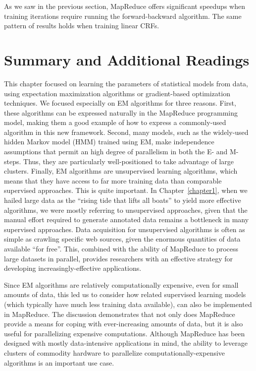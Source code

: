 As we saw in the previous section, MapReduce offers significant
speedups when training iterations require running the forward-backward
algorithm.  The same pattern of results holds when training linear
CRFs.

\section{Summary and Additional Readings}
\label{chapter6_conclusions}

This chapter focused on learning the parameters of statistical models
from data, using expectation maximization algorithms or gradient-based
optimization techniques.  We focused especially on EM algorithms for
three reasons.  First, these algorithms can be expressed naturally in
the MapReduce programming model, making them a good example of how to
express a commonly-used algorithm in this new framework.  Second, many
models, such as the widely-used hidden Markov model (HMM) trained
using EM, make independence assumptions that permit an high degree of
parallelism in both the E- and M-steps.  Thus, they are particularly
well-positioned to take advantage of large clusters.  Finally, EM
algorithms are unsupervised learning algorithms, which means that they
have access to far more training data than comparable supervised
approaches.  This is quite important.  In Chapter~\ref{chapter1}, when
we hailed large data as the ``rising tide that lifts all boats'' to
yield more effective algorithms, we were mostly referring to
unsupervised approaches, given that the manual effort required to
generate annotated data remains a bottleneck in many supervised
approaches.  Data acquisition for unsupervised algorithms is often as
simple as crawling specific web sources, given the enormous quantities
of data available ``for free''.  This, combined with the ability of
MapReduce to process large datasets in parallel, provides researchers
with an effective strategy for developing increasingly-effective
applications.

Since EM algorithms are relatively computationally expensive, even for
small amounts of data, this led us to consider how related supervised
learning models (which typically have much less training data
available), can also be implemented in MapReduce.  The discussion
demonstrates that not only does MapReduce provide a means for coping
with ever-increasing amounts of data, but it is also useful for
parallelizing expensive computations.  Although MapReduce has been
designed with mostly data-intensive applications in mind, the ability
to leverage clusters of commodity hardware to parallelize
computationally-expensive algorithms is an important use case.

